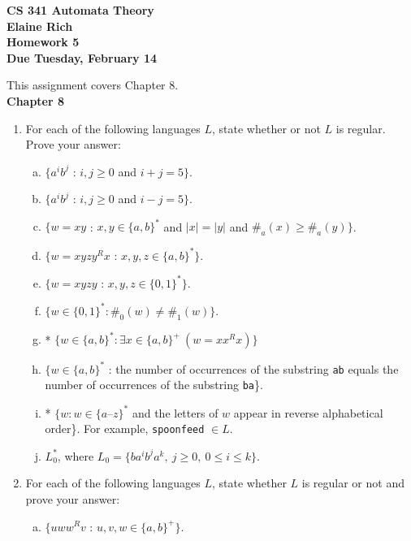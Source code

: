 \documentclass[10pt]{article}
\newcommand{\card}[1]{\left| #1 \right|}
\begin{document}
\begin{center}
\textbf{
CS 341 Automata Theory \\
Elaine Rich \\
Homework 5 \\
Due Tuesday, February 14}\\
\end{center}
\noindent
This assignment covers Chapter 8. \\

\noindent
\textbf{Chapter 8}
\begin{enumerate}[1)]

\item
For each of the following languages $L$, state whether or not $L$ is regular.  Prove your answer:
\begin{enumerate}[a)]
\item
$\{a^ib^j$ : $i, j \geq 0$ and $i + j = 5\}$.

\item
$\{a^ib^j$ : $i, j \geq 0$ and $i - j = 5\}$.

\item
$\{w = xy$ : $x, y \in \{a, b\}^*$ and $\card{x} = \card{y}$ and $\#_a(x) \geq \#_a(y)\}$.

\item
$\{w = xyzy^Rx$ : $x, y, z \in \{a, b\}^*\}$.

\item
$\{w = xyzy$ : $x, y, z \in \{0, 1\}^*\}$.

\item
$\{w \in \{0, 1\}^* : \#_0(w) \neq \#_1(w)\}$.

\item
* $\{w \in \{a, b\}^* : \exists x \in \{a, b\}^+\ (w = xx^Rx)\}$

\item
$\{w \in \{a, b\}^*$ : the number of occurrences of the substring \texttt{ab} equals the number of occurrences of the substring \texttt{ba}\}.

\item
* $\{w: w \in \{a – z\}^*$ and the letters of $w$ appear in reverse alphabetical order\}.  For example, \texttt{spoonfeed} $\in L$.

\item
$L_0^*$, where $L_0 = \{ba^ib^ja^k,\ j \geq 0,\ 0 \leq i \leq k\}$.
\end{enumerate}


\item
For each of the following languages $L$, state whether $L$ is regular or not and prove your answer:
\begin{enumerate}[a)]
\item
$\{uww^Rv$ : $u, v, w \in \{a, b\}^+\}$.


\end{enumerate}
\end{enumerate}
\end{document}
